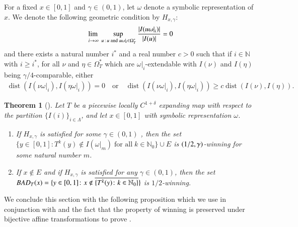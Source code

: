 \documentclass[a4paper,reqno,10pt]{amsart}
\newtheorem{theorem}{Theorem}[section]
\begin{document}
For a fixed $x \in [0,1]$ and $\gamma \in (0, 1)$, let $\omega$ denote a symbolic representation of $x$. We denote the following geometric condition by $H_{x, \gamma}$:
    \begin{align}\label{eq:condition_1}
        \adjustlimits
        \lim_{i \to \infty} \sup_{\; u\,:\,u\;\text{and}\;u\omega\vert_{i}\in\Omega_{T}^{*}} \frac{\lvert I(u\omega\vert_{i}) \rvert}{\lvert I(u) \rvert} = 0
    \end{align}
and there exists a natural number $i^{*}$ and a real number $c>0$ such that if $i \in \mathbb{N}$ with $i \geq i^{*}$, for all $\nu$ and $\eta \in \Omega_{T}^{*}$ which are $\omega\vert_{i}$-extendable with $I(\nu)$ and $I(\eta)$ being $\gamma/4$-comparable, either
    \begin{align}\label{eq:condition_2}
        \operatorname{dist}(I(\nu\omega\vert_{i}), I(\eta\omega\vert_{i})) = 0
        \quad \text{or} \quad
        \operatorname{dist}(I(\nu\omega\vert_{i}), I(\eta\omega\vert_{i})) \geq c \operatorname{dist}(I(\nu), I(\eta)).
    \end{align}

    \begin{theorem}[{\cite{HY}}]\label{thm_HY_Thm_2.1}
        Let $T$ be a piecewise locally $C^{1+\delta}$ expanding map with respect to the partition $\{ I(i) \}_{i \in \Lambda}$, and let $x \in [0, 1]$ with symbolic representation $\omega$.
            \begin{enumerate}[label={\rm(\arabic*)}]
                \item If $H_{x, \gamma}$ is satisfied for some $\gamma \in (0, 1)$ , then the set $\{ y \in [0,1] \colon T^{k}(y) \not\in I(\omega\vert_{m}) \; \text{for all} \; k \in \mathbb{N}_{0} \} \cup E$ is $\rm ( 1/2, \gamma)$-winning for some natural number $m$.
                \item If $x \not\in E$ and if $H_{x, \gamma}$ is satisfied for any $\gamma \in (0, 1)$, then the set ${\rm BAD}_{T}(x) = \{ y \in [0, 1] \colon x \not\in \overline{\{T^k(y) \colon k \in \mathbb{N}_{0}\}}\}$ is $1/2$-winning.
            \end{enumerate}
        \end{theorem}

We conclude this section with the following proposition which we use in conjunction with  and the fact that the property of winning is preserved under bijective affine transformations to prove .
\end{document}
